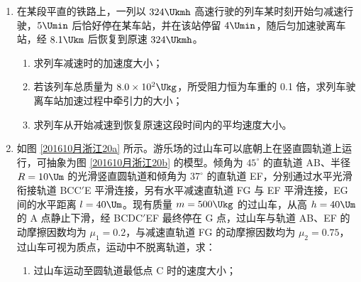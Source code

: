 \documentclass[\gkver]{gaokaozhenti}
\begin{document}
\begin{enumerate}
\item
在某段平直的铁路上，一列以 $324\Ukmh$ 高速行驶的列车某时刻开始匀减速行驶，$5\Umin$ 后恰好停在某车站，并在该站停留 $4\Umin$，随后匀加速驶离车站，经 $8.1\Ukm$ 后恢复到原速 $324\Ukmh$。
\begin{enumerate}
	\item
	求列车减速时的加速度大小；

	\item
	若该列车总质量为 $8.0\times10^{2}\Ukg$，所受阻力恒为车重的 0.1 倍，求列车驶离车站加速过程中牵引力的大小；

	\item
	求列车从开始减速到恢复原速这段时间内的平均速度大小。
\end{enumerate}

\item
如图 \ref{201610月浙江20a} 所示。游乐场的过山车可以底朝上在竖直圆轨道上运行，可抽象为图 \ref{201610月浙江20b} 的模型。倾角为 $45^{\circ}$ 的直轨道 AB、半径 $R=10\Um$ 的光滑竖直圆轨道和倾角为 $37^{\circ}$ 的直轨道 EF，分别通过水平光滑衔接轨道 BCC$'$E 平滑连接，另有水平减速直轨道 FG 与 EF 平滑连接，EG 间的水平距离 $l=40\Um$。现有质量 $m=500\Ukg$ 的过山车，从高 $h=40\Um$ 的 A 点静止下滑，经 BCDC$'$EF 最终停在 G 点，过山车与轨道 AB、EF 的动摩擦因数均为 $\mu_{1}=0.2$，与减速直轨道 FG 的动摩擦因数均为 $\mu_{2}=0.75$，过山车可视为质点，运动中不脱离轨道，求：
\begin{enumerate}
	\item
	过山车运动至圆轨道最低点 C 时的速度大小；


\end{enumerate}
\end{enumerate}
\end{document}
